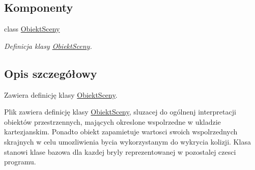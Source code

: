 \subsection*{Komponenty}
\begin{DoxyCompactItemize}
\item 
class \hyperlink{classObiektSceny}{Obiekt\+Sceny}
\begin{DoxyCompactList}\small\item\em Definicja klasy \hyperlink{classObiektSceny}{Obiekt\+Sceny}. \end{DoxyCompactList}\end{DoxyCompactItemize}


\subsection{Opis szczegółowy}
Zawiera definicję klasy \hyperlink{classObiektSceny}{Obiekt\+Sceny}. 

Plik zawiera definicję klasy \hyperlink{classObiektSceny}{Obiekt\+Sceny}, sluzacej do ogólnenj interpretacji obiektów przestrzennych, mających okreslone wspolrzedne w ukladzie kartezjanskim. Ponadto obiekt zapamietuje wartosci swoich wspolrzednych skrajnych w celu umozliwienia bycia wykorzystanym do wykrycia kolizji. Klasa stanowi klase bazowa dla kazdej bryly reprezentowanej w pozostalej czesci programu. 